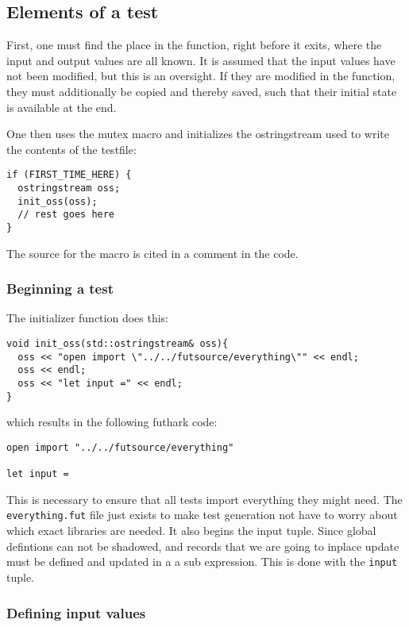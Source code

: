 \subsection{Elements of a test}
First, one must find the place in the function, right before it exits, where the input and output values are all known. It is assumed that the input values have not been modified, but this is an oversight. If they are modified in the function, they must additionally be copied and thereby saved, such that their initial state is available at the end.

One then uses the mutex macro and initializes the ostringstream used to write the contents of the testfile:
\begin{verbatim}
if (FIRST_TIME_HERE) {
  ostringstream oss;
  init_oss(oss);
  // rest goes here
}
\end{verbatim}
The source for the macro is cited in a comment in the code.

\subsubsection*{Beginning a test}

The initializer function does this:

\begin{verbatim}
void init_oss(std::ostringstream& oss){
  oss << "open import \"../../futsource/everything\"" << endl;
  oss << endl;
  oss << "let input =" << endl;
}
\end{verbatim}

which results in the following futhark code:

\begin{verbatim}
open import "../../futsource/everything"

let input =
\end{verbatim}

This is necessary to ensure that all tests import everything they might need. The \texttt{everything.fut} file just exists to make test generation not have to worry about which exact libraries are needed. It also begins the input tuple. Since global defintions can not be shadowed, and records that we are going to inplace update must be defined and updated in a a sub expression. This is done with the \texttt{input} tuple.

\subsubsection*{Defining input values}

